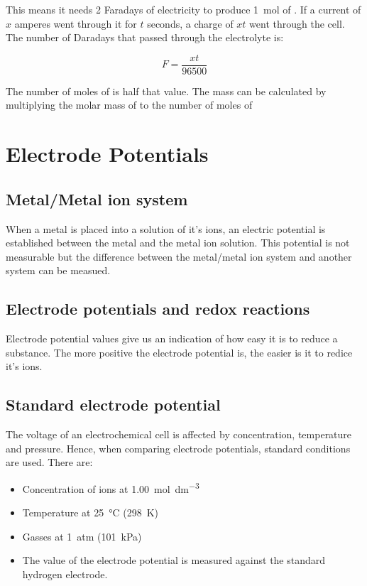 \documentclass{scrbook}
\begin{document}
	This means it needs 2 Faradays of electricity to produce \SI{1}{\mole} of . If a current of $x$ amperes went through it for $t$ seconds, a charge of $xt$ went through the cell. The number of Daradays that passed through the electrolyte is:

	\[ F = \frac{xt}{96500} \]

	The number of moles of  is half that value. The mass can be calculated by multiplying the molar mass of  to the number of moles of 

\section{Electrode Potentials}

\subsection{Metal/Metal ion system}

	When a metal is placed into a solution of it's ions, an electric potential is established between the metal and the metal ion solution. This potential is not measurable but the difference between the metal/metal ion system and another system can be measued.

\subsection{Electrode potentials and redox reactions}

	Electrode potential values give us an indication of how easy it is to reduce a substance. The more positive the electrode potential is, the easier is it to redice it's ions.

\subsection{Standard electrode potential}

	The voltage of an electrochemical cell is affected by concentration, temperature and pressure. Hence, when comparing electrode potentials, standard conditions are used. There are:

	\begin{itemize}
		\item
			Concentration of ions at \SI{1.00}{\mole\per\deci\metre\cubed}
		\item
			Temperature at \SI{25}{\celsius} (\SI{298}{\kelvin})
		\item
			Gasses at \SI{1}{atm} (\SI{101}{\kilo\pascal})
		\item
			The value of the electrode potential is measured against the standard hydrogen electrode.
	\end{itemize}
\end{document}
